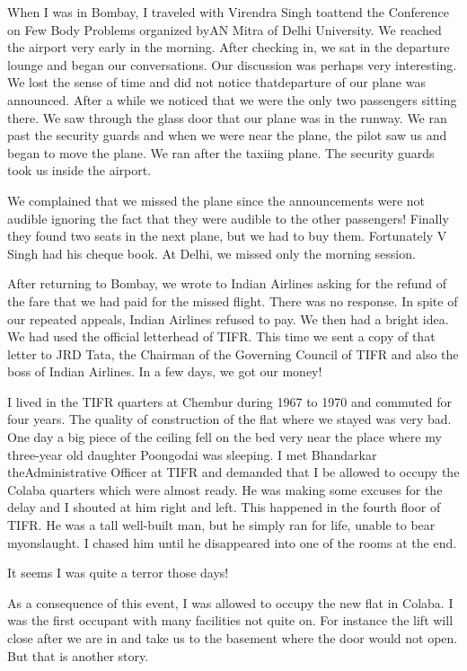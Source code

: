 When I was in Bombay, I traveled with Virendra Singh to\break attend the 
Conference on Few Body Problems organized by\break AN Mitra of Delhi 
University. We reached the airport very early in the morning. After 
checking in, we sat in the departure lounge and began our conversations. 
Our discussion was perhaps very interesting. We lost the sense of time 
and did not notice that\break departure of our plane was announced. After a 
while we noticed\- that we were the only two passengers sitting there. We 
saw through the glass door that our plane was in the runway. We ran past 
the security guards and when we were near the plane, the pilot saw us 
and began to move the plane. We ran after the taxiing plane. The 
security guards took us inside the airport.
\smallskip

We complained that we missed the plane since the announcements were not 
audible ignoring the fact that they were audible to the other 
passengers! Finally they found two seats in the next plane, but we had 
to buy them. Fortunately V Singh had his cheque book. At Delhi, we 
missed only the morning session.
\smallskip

After returning to Bombay, we wrote to Indian Airlines asking for the 
refund of the fare that we had paid for the missed flight. There was no 
response. In spite of our repeated appeals, Indian Airlines refused to 
pay. We then had a bright idea. We had used the official letterhead of 
TIFR. This time we sent a copy of that letter to JRD Tata, the Chairman 
of the Governing Council of TIFR and also the boss of Indian Airlines. 
In a few days, we got our money!
\smallskip

I lived in the TIFR quarters at Chembur during 1967 to 1970 and commuted 
for four years. The quality of construction of the flat where we stayed 
was very bad. One day a big piece of the ceiling fell on the bed very 
near the place where my three-year old daughter Poongodai was sleeping. 
I met Bhandarkar the\break Administrative Officer at TIFR and demanded that I 
be allowed to occupy the Colaba quarters which were almost ready. He was 
making some excuses for the delay and I shouted at him right and left. 
This happened in the fourth floor of TIFR. He was a tall well-built man, 
but he simply ran for life, unable to bear my\break onslaught. I chased him 
until he disappeared into one of the rooms at the end.
\smallskip

It seems I was quite a terror those days!
\smallskip

As a consequence of this event, I was allowed to occupy the new flat in 
Colaba. I was the first occupant with many facilities not quite on. For 
instance the lift will close after we are in and take us to the basement 
where the door would not open. But that is another story.
\smallskip

